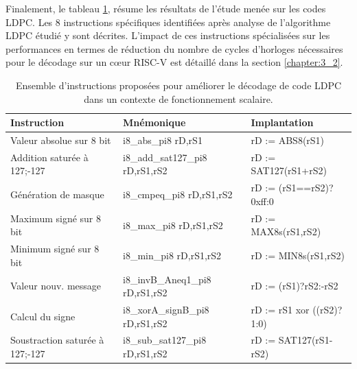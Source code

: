 \documentclass[../main.tex]{subfiles}
\begin{document}
Finalement, le tableau \ref{tab:instr_ldpc}, résume les résultats de l'étude menée sur les codes LDPC. Les 8 instructions spécifiques identifiées après analyse de l'algorithme LDPC étudié y sont décrites. L'impact de ces instructions spécialisées sur les performances en termes de réduction du nombre de cycles d'horloges nécessaires pour le décodage sur un cœur RISC-V est détaillé dans la section \ref{chapter:3_2}. 
\begin{table}[!tb]
\footnotesize
\centering
\begin{tabular}{ l || l l }
\hline
\textbf{Instruction}            & \textbf{Mnémonique}              & \textbf{Implantation} \\
\hline
Valeur absolue sur 8 bit        & i8\_abs\_pi8 rD,rS1              & rD := ABS8(rS1)   \\ 
Addition saturée à 127;-127     & i8\_add\_sat127\_pi8 rD,rS1,rS2  & rD := SAT127(rS1+rS2)   \\ 
Génération de masque            & i8\_cmpeq\_pi8 rD,rS1,rS2        & rD := (rS1==rS2)?0xff:0   \\ 
Maximum signé sur 8 bit         & i8\_max\_pi8 rD,rS1,rS2          & rD := MAX8s(rS1,rS2)  \\ 
Minimum signé sur 8 bit         & i8\_min\_pi8 rD,rS1,rS2          & rD := MIN8s(rS1,rS2) \\ 
Valeur nouv. message            & i8\_invB\_Aneq1\_pi8 rD,rS1,rS2  & rD := (rS1\geqslant1)?rS2:-rS2 \\ 
Calcul du signe                 & i8\_xorA\_signB\_pi8 rD,rS1,rS2  & rD := rS1 xor ((rS2\geqslant0)?1:0) \\
Soustraction saturée à 127;-127 & i8\_sub\_sat127\_pi8 rD,rS1,rS2  & rD := SAT127(rS1-rS2) \\ 
\hline
\end{tabular}
\caption{Ensemble d'instructions proposées pour améliorer le décodage de code LDPC dans un contexte de fonctionnement scalaire.}
\label{tab:instr_ldpc}
\end{table}
%
%
%
%
\end{document}
